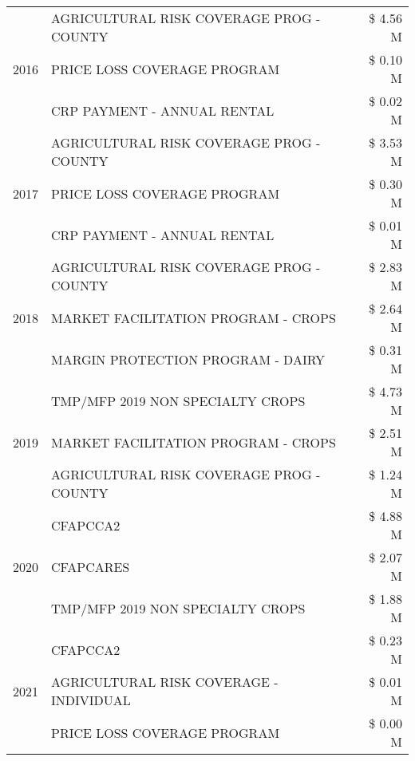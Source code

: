 \begin{tabular}{llr}
\cline{1-3}
\multirow[t]{3}{*}{2016} & AGRICULTURAL RISK COVERAGE PROG - COUNTY & \$ 4.56 M \\
 & PRICE LOSS COVERAGE PROGRAM & \$ 0.10 M \\
 & CRP PAYMENT - ANNUAL RENTAL & \$ 0.02 M \\
\cline{1-3}
\multirow[t]{3}{*}{2017} & AGRICULTURAL RISK COVERAGE PROG - COUNTY & \$ 3.53 M \\
 & PRICE LOSS COVERAGE PROGRAM & \$ 0.30 M \\
 & CRP PAYMENT - ANNUAL RENTAL & \$ 0.01 M \\
\cline{1-3}
\multirow[t]{3}{*}{2018} & AGRICULTURAL RISK COVERAGE PROG - COUNTY & \$ 2.83 M \\
 & MARKET FACILITATION PROGRAM - CROPS & \$ 2.64 M \\
 & MARGIN PROTECTION PROGRAM - DAIRY & \$ 0.31 M \\
\cline{1-3}
\multirow[t]{3}{*}{2019} & TMP/MFP 2019 NON SPECIALTY CROPS & \$ 4.73 M \\
 & MARKET FACILITATION PROGRAM - CROPS & \$ 2.51 M \\
 & AGRICULTURAL RISK COVERAGE PROG - COUNTY & \$ 1.24 M \\
\cline{1-3}
\multirow[t]{3}{*}{2020} & CFAPCCA2 & \$ 4.88 M \\
 & CFAPCARES & \$ 2.07 M \\
 & TMP/MFP 2019 NON SPECIALTY CROPS & \$ 1.88 M \\
\cline{1-3}
\multirow[t]{3}{*}{2021} & CFAPCCA2 & \$ 0.23 M \\
 & AGRICULTURAL RISK COVERAGE - INDIVIDUAL & \$ 0.01 M \\
 & PRICE LOSS COVERAGE PROGRAM & \$ 0.00 M \\
\cline{1-3}
\bottomrule
\end{tabular}
